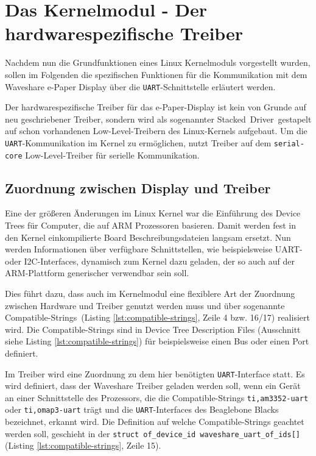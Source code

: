 
\chapter{Das Kernelmodul - Der hardwarespezifische Treiber} %
Nachdem nun die Grundfunktionen eines Linux Kernelmoduls vorgestellt wurden, sollen im Folgenden die spezifischen Funktionen für die Kommunikation mit dem Waveshare e-Paper Display über die \texttt{UART}-Schnittstelle erläutert werden.

Der hardwarespezifische Treiber für das e-Paper-Display ist kein von Grunde auf neu geschriebener Treiber, sondern wird als sogenannter \glqq Stacked~Driver\grqq~gestapelt auf schon vorhandenen Low-Level-Treibern des Linux-Kernels aufgebaut. 
Um die \texttt{UART}-Kommunikation im Kernel zu ermöglichen, nutzt Treiber auf dem \texttt{serial-core} Low-Level-Treiber für serielle Kommunikation. 

\section{Zuordnung zwischen Display und Treiber} %
Eine der größeren Änderungen im Linux Kernel war die Einführung des Device Trees für Computer, die auf ARM Prozessoren basieren. Damit werden fest in den Kernel einkompilierte Board Beschreibungsdateien langsam ersetzt. Nun werden Informationen über verfügbare Schnittstellen, wie beispielsweise UART- oder I2C-Interfaces, dynamisch zum Kernel dazu geladen, der so auch auf der ARM-Plattform generischer verwendbar sein soll. 

Dies führt dazu, dass auch im Kernelmodul eine flexiblere Art der Zuordnung zwischen Hardware und Treiber genutzt werden muss und über sogenannte \glqq Compatible-Strings\grqq~(Listing \ref{lst:compatible-strings}, Zeile 4 bzw. 16/17) realisiert wird. Die Compatible-Strings sind in Device Tree Description Files (Ausschnitt siehe Listing \ref{lst:compatible-strings}) für beispielsweise einen Bus oder einen Port definiert. 

Im Treiber wird eine Zuordnung zu dem hier benötigten \texttt{UART}-Interface statt. Es wird definiert, dass der Waveshare Treiber geladen werden soll, wenn ein Gerät an einer Schnittstelle des Prozessors, die die Compatible-Strings \texttt{ti,am3352-uart} oder \texttt{ti,omap3-uart} trägt und die \texttt{UART}-Interfaces des Beaglebone Blacks bezeichnet, erkannt wird. Die Definition auf welche Compatible-Strings geachtet werden soll, geschieht in der \texttt{struct of_device_id waveshare_uart_of_ids[]} (Listing \ref{lst:compatible-strings}, Zeile 15).

